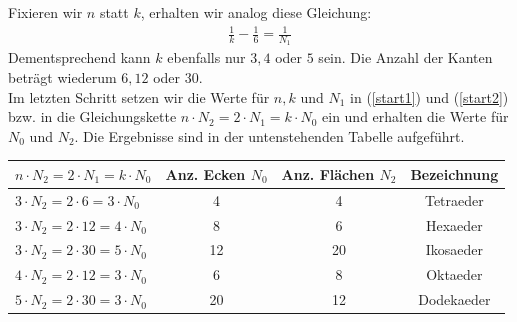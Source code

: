 Fixieren wir $n$ statt $k$, erhalten wir analog diese Gleichung: 
\begin{align}
\frac{1}{k}- \frac{1}{6}= \frac{1}{N_1} \label{nfix}
\end{align}
 Dementsprechend kann $k$ ebenfalls nur $3,4$ oder $5$ sein. Die Anzahl der Kanten beträgt wiederum $6, 12$ oder $30$.\\
Im letzten Schritt setzen wir die Werte für $n,k$ und $N_1$ in (\ref{start1}) und (\ref{start2}) bzw. in die Gleichungskette $n\cdot N_2=2\cdot N_1=k\cdot N_0$ ein und erhalten die Werte für $N_0$ und $N_2$. Die Ergebnisse sind in der untenstehenden Tabelle aufgeführt.
\begin{center}
\begin{tabular}{p{4.5cm}|c|c|c}
$n\cdot N_2=2\cdot N_1=k\cdot N_0$ & Anz. Ecken $N_0$& Anz. Flächen $N_2$& Bezeichnung\\ \hline
$3 \cdot N_2=2 \cdot 6=3 \cdot N_0$& 4 & 4 & Tetraeder\\ \hline
$3\cdot N_2=2 \cdot 12=4\cdot N_0$& 8 & 6 & Hexaeder \\ \hline
$3\cdot N_2=2 \cdot 30=5\cdot N_0$& 12 & 20 & Ikosaeder\\ \hline
$4\cdot N_2=2 \cdot 12=3\cdot N_0$& 6 & 8 & Oktaeder \\ \hline
$5\cdot N_2=2 \cdot 30=3\cdot N_0$& 20 & 12 & Dodekaeder

\end{tabular}
\end{center}
